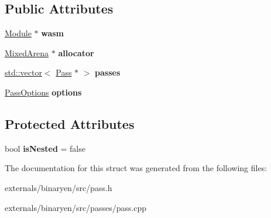 \subsection*{Public Attributes}
\begin{DoxyCompactItemize}
\item 
\mbox{\label{structwasm_1_1_pass_runner_aa98f9de4f014d3d98316e95ca9299fd4}} 
\mbox{\hyperlink{classwasm_1_1_module}{Module}} $\ast$ {\bfseries wasm}
\item 
\mbox{\label{structwasm_1_1_pass_runner_a88f175d5fecee44a97e9f1d7c0d7e18b}} 
\mbox{\hyperlink{struct_mixed_arena}{Mixed\+Arena}} $\ast$ {\bfseries allocator}
\item 
\mbox{\label{structwasm_1_1_pass_runner_ad9ca926aa3cbee057de200f2eb114dc6}} 
\mbox{\hyperlink{classstd_1_1vector}{std\+::vector}}$<$ \mbox{\hyperlink{classwasm_1_1_pass}{Pass}} $\ast$ $>$ {\bfseries passes}
\item 
\mbox{\label{structwasm_1_1_pass_runner_adf288d16764a79e93e7cbb25902d15a2}} 
\mbox{\hyperlink{structwasm_1_1_pass_options}{Pass\+Options}} {\bfseries options}
\end{DoxyCompactItemize}
\subsection*{Protected Attributes}
\begin{DoxyCompactItemize}
\item 
\mbox{\label{structwasm_1_1_pass_runner_a325906d9587f53fe9f104ed342c19b71}} 
bool {\bfseries is\+Nested} = false
\end{DoxyCompactItemize}


The documentation for this struct was generated from the following files\+:\begin{DoxyCompactItemize}
\item 
externals/binaryen/src/pass.\+h\item 
externals/binaryen/src/passes/pass.\+cpp\end{DoxyCompactItemize}
